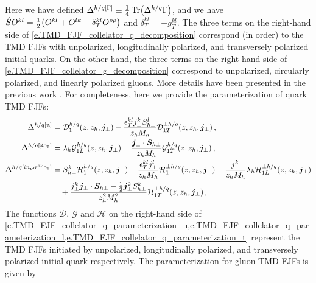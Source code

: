 \documentclass[a4paper, 11 pt]{article}
\begin{document}
Here we have defined $\Delta^{h/q [\Gamma]} \equiv \frac{1}{4} \Tr(\Delta ^{h/q} \Gamma)$, and we have $\hat{S}O^{kl} = \frac{1}{2} \pqty{O^{kl} + O^{lk} - \delta_T^{kl}O^{\rho\rho}}$ and $\delta_T^{kl} = -g_T^{kl}$. The three terms on the right-hand side of \cref{e.TMD_FJF_collelator_q_decomposition} correspond (in order) to the TMD FJFs with unpolarized, longitudinally polarized, and transversely polarized initial quarks. On the other hand,  the three terms on the right-hand side of \cref{e.TMD_FJF_collelator_g_decomposition} correspond to unpolarized, circularly polarized, and linearly polarized gluons. More details have been presented in the previous work \cite{Kang:2020xyq}. For completeness, here we provide the parameterization of quark TMD FJFs:
\begin{align}
\Delta ^{h/q [\slashed{n}]}
& =
\mathcal{D}_1^{h/q}(z,z_h,\boldsymbol{j}_{\perp})
-
\frac{\epsilon ^{kl}_T j_{\perp}^k S_{h \perp}^l}{z_h M_h} \mathcal{D}_{1T}^{\perp h/q}(z,z_h,\boldsymbol{j}_{\perp})
\, , \label{e.TMD_FJF_collelator_q_parameterization_u} \\
\Delta ^{h/q [\slashed{n} \gamma _5]}
& =
\lambda_h \mathcal{G}_{1L}^{h/q}(z,z_h,\boldsymbol{j}_{\perp})
-
\frac{\boldsymbol{j}_{\perp} \cdot \boldsymbol{S}_{h \perp}}{z_h M_h} \mathcal{G}_{1T}^{h/q}(z,z_h,\boldsymbol{j}_{\perp})
\, , \label{e.TMD_FJF_collelator_q_parameterization_l} \\
\Delta ^{h/q [i n_\nu \sigma^{k\nu} \gamma _5]}
& =
S_{h\perp}^k \mathcal{H}_1^{h/q}(z,z_h,\boldsymbol{j}_{\perp})
-
\frac{\epsilon^{kl}_T j_{\perp}^l}{z_h M_h} \mathcal{H}_{1}^{\perp h/q}(z,z_h,\boldsymbol{j}_{\perp})
-
\frac{j_{\perp}^k}{z_h M_h} \lambda_h {\mathcal{H}_{1L}^{\perp h/q}(z,z_h,\boldsymbol{j}_{\perp})}
\nonumber \\
& \quad +
\frac{j_{\perp}^k \boldsymbol{j}_{\perp} \cdot \boldsymbol{S}_{h \perp} - \frac{1}{2} \boldsymbol{j}_{\perp}^2 S_{h \perp}^k}{z_h^2 M_h^2} \mathcal{H}_{1T}^{\perp h/q} (z, z_h, \boldsymbol{j}_{\perp})
\, , \label{e.TMD_FJF_collelator_q_parameterization_t}
\end{align}
The functions $\mathcal{D}$, $\mathcal{G}$ and $\mathcal{H}$ on the right-hand side of \cref{e.TMD_FJF_collelator_q_parameterization_u,e.TMD_FJF_collelator_q_parameterization_l,e.TMD_FJF_collelator_q_parameterization_t} represent the TMD FJFs initiated by unpolarized, longitudinally polarized, and transversely polarized initial quark respectively.
The parameterization for gluon TMD FJFs is given by
\end{document}
